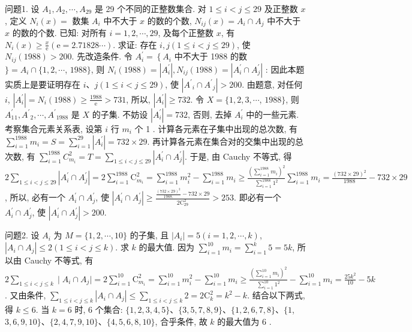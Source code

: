 
问题1. 设 $A_1, A_2, \cdots, A_{29}$ 是 29 个不同的正整数集合.
对 $1 \leqslant i<j \leqslant 29$ 及正整数 $x$, 定义 $N_i(x)=$ 数集 $A_i$ 中不大于 $x$ 的数的个数, $N_{i j}(x)=A_i \cap A_j$ 中不大于 $x$ 的数的个数.
已知: 对所有 $i=1,2, \cdots, 29$, 及每个正整数 $x$, 有 $N_i(x) \geqslant \frac{x}{\mathrm{e}}(\mathrm{e}=2.71828 \cdots)$. 求证: 存在 $i, j(1 \leqslant i<j \leqslant 29)$, 使 $N_{i j}(1988)>200$. 
先改造条件.
令 $A_i^{\prime}=\left\{A_i\right.$ 中不大于 1988 的数 $\}=A_i \cap\{1,2, \cdots$, $1988\}$, 则 $N_i(1988)=\left|A_i^{\prime}\right|, N_{i j}(1988)=\left|A_i^{\prime} \cap A_j^{\prime}\right|$ : 因此本题实质上是要证明存在 $i 、 j(1 \leqslant i<j \leqslant 29)$, 使 $\left|A^{\prime}{ }_i \cap A^{\prime}{ }_j\right|>200$. 由题意, 对任何 $i$, $\left|A_i^{\prime}\right|=N_i(1988) \geqslant \frac{1988}{\mathrm{e}}>731$, 所以, $\left|A_i^{\prime}\right| \geqslant 732$. 令 $X=\{1,2,3, \cdots$, $1988\}$, 则 $A_1^{\prime}{ }_1, A^{\prime}{ }_2, \cdots, A^{\prime}{ }_{1988}$ 是 $X$ 的子集.
不妨设 $\left|A_i^{\prime}\right|=732$, 否则, 去掉 $A_i^{\prime}$ 中的一些元素.
考察集合元素关系表, 设第 $i$ 行 $m_i$ 个 1 . 计算各元素在子集中出现的总次数, 有 $\sum_{i=1}^{1988} m_i=S=\sum_{i=1}^{29}\left|A_i^{\prime}\right|=732 \times 29$. 再计算各元素在集合对的交集中出现的总次数, 有 $\sum_{i=1}^{1988} C_{m_i}^2=T=\sum_{1 \leqslant i<j \leqslant 29}\left|A_i^{\prime} \cap A_j^{\prime}\right|$. 于是, 由 Cauchy 不等式, 得 $2 \sum_{1 \leqslant i<j \leqslant 29}\left|A_i^{\prime} \cap A_j^{\prime}\right|=2 \sum_{i=1}^{1988} \mathrm{C}_{m_i}^2=\sum_{i=1}^{1988} m_i^2-\sum_{i=1}^{1988} m_i \geqslant \frac{\left(\sum_{i=1}^{1988} m_i\right)^2}{\sum_{i=1}^{1988} 1^2} \sum_{i=1}^{1988} m_i=\frac{(732 \times 29)^2}{1988}-732 \times 29$, 所以, 必有一个 $A_i^{\prime} \cap A_j^{\prime}$, 使 $\left|A_i^{\prime} \cap A_j^{\prime}\right| \geqslant\frac{\frac{(732 \times 29)^2}{1988 .}-732 \times 29}{2 \mathrm{C}_{29}^2}>253$. 即必有一个 $A_i^{\prime} \cap A_j^{\prime}$, 使 $\left|A_i^{\prime} \cap A_j^{\prime}\right|>200$.



问题2. 设 $A_i$ 为 $M=\{1,2, \cdots, 10\}$ 的子集, 且 $\left|A_i\right|=5(i=1,2, \cdots, k)$, $\left|A_i \cap A_j\right| \leqslant 2(1 \leqslant i<j \leqslant k)$. 求 $k$ 的最大值.
因为 $\sum_{i=1}^{10} m_i=\sum_{i=1}^k 5=5 k$, 所以由 Cauchy 不等式, 有 $2 \sum_{1 \leqslant i<j \leqslant k} \mid A_i \cap A_j \mid=2 \sum_{i=1}^{10} \mathrm{C}_{m_i}^2=\sum_{i=1}^{10} m_i^2-\sum_{i=1}^{10} m_i \geqslant \frac{\left(\sum_{i=1}^{10} m_i\right)^2}{\sum_{i=1}^{10} 1^2}-\sum_{i=1}^{10} m_i=\frac{25 k^2}{10}-5 k$. 又由条件, $\sum_{1 \leqslant i<j \leqslant k}\left|A_i \cap A_j\right| \leqslant \sum_{1 \leqslant i<j \leqslant k} 2=2 \mathrm{C}_k^2=k^2-k$. 结合以下两式, 得 $k \leqslant 6$. 当 $k=6$ 时, 6 个集合: $\{1,2,3,4,5\} 、\{3,5,7,8,9\} 、\{1,2,6,7,8\} 、\{1$, $3,6,9,10\} 、\{2,4,7,9,10\} 、\{4,5,6,8,10\}$, 合乎条件, 故 $k$ 的最大值为 6 .



